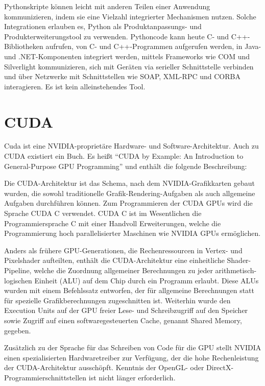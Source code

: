 Pythonskripte können leicht mit anderen Teilen einer Anwendung kommunizieren, indem sie eine Vielzahl integrierter Mechanismen nutzen. Solche Integrationen erlauben es, Python als Produktanpassungs- und Produkterweiterungstool zu verwenden. Pythoncode kann heute C- und C++-Bibliotheken aufrufen, von C- und C++-Programmen aufgerufen werden, in Java- und .NET-Komponenten integriert werden, mittels Frameworks wie COM und Silverlight kommunizieren, sich mit Geräten via serieller Schnittstelle verbinden und über Netzwerke mit Schnittstellen wie SOAP, XML-RPC und CORBA interagieren. Es ist kein alleinstehendes Tool. \cite{lutz2013python}

\section{CUDA}
\label{sec:cuda}
Cuda ist eine NVIDIA-proprietäre Hardware- und Software-Architektur. Auch zu CUDA existiert ein Buch. Es heißt ``CUDA by Example: An Introduction to General-Purpose GPU Programming'' \cite{sanders2010cuda} und enthält die folgende Beschreibung:

Die CUDA-Architektur ist das Schema, nach dem NVIDIA-Grafikkarten gebaut wurden, die sowohl traditionelle Grafik-Rendering-Aufgaben als auch allgemeine Aufgaben durchführen können. Zum Programmieren der CUDA GPUs wird die Sprache CUDA C verwendet. CUDA C ist im Wesentlichen die Programmiersprache C mit einer Handvoll Erweiterungen, welche die Programmierung hoch parallelisierter Maschinen wie NVIDIA GPUs ermöglichen.

Anders als frühere GPU-Generationen, die Rechenressourcen in Vertex- und Pixelshader aufteilten, enthält die CUDA-Architektur eine einheitliche Shader-Pipeline, welche die Zuordnung allgemeiner Berechnungen zu jeder arithmetisch-logischen Einheit (ALU) auf dem Chip durch ein Programm erlaubt. Diese ALUs wurden mit einem Befehlssatz entworfen, der für allgemeine Berechnungen statt für spezielle Grafikberechnungen zugeschnitten ist. Weiterhin wurde den Execution Units auf der GPU freier Lese- und Schreibzugriff auf den Speicher sowie Zugriff auf einen softwaregesteuerten Cache, genannt Shared Memory, gegeben.

Zusätzlich zu der Sprache für das Schreiben von Code für die GPU stellt NVIDIA einen spezialisierten Hardwaretreiber zur Verfügung, der die hohe Rechenleistung der CUDA-Architektur ausschöpft. Kenntnis der OpenGL- oder DirectX-Programmierschnittstellen ist nicht länger erforderlich. \cite{sanders2010cuda}

